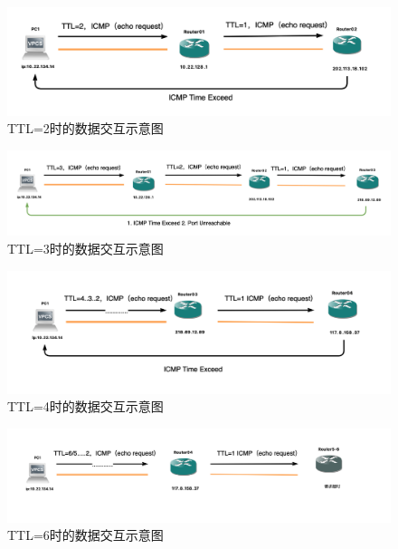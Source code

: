 \documentclass[a4paper,12pt]{report}
\begin{document}
\begin{spacing}{1.5}
\begin{figure}[htb!]
  \centering
\includegraphics[width=16cm]{figure/ttl-2.png}
\caption{TTL=2时的数据交互示意图}
\label{pic:ttl2}
\end{figure}

\begin{figure}[htb!]
  \centering
\includegraphics[width=16cm]{figure/ttl-3.png}
\caption{TTL=3时的数据交互示意图}
\label{pic:ttl3}
\end{figure}

\begin{figure}[htb!]
  \centering
\includegraphics[width=16cm]{figure/ttl-4.png}
\caption{TTL=4时的数据交互示意图}
\label{pic:ttl4}
\end{figure}

\begin{figure}[htb!]
  \centering
\includegraphics[width=16cm]{figure/ttl-6.png}
\caption{TTL=6时的数据交互示意图}
\label{pic:ttl6}
\end{figure}


\end{spacing}
\end{document}
